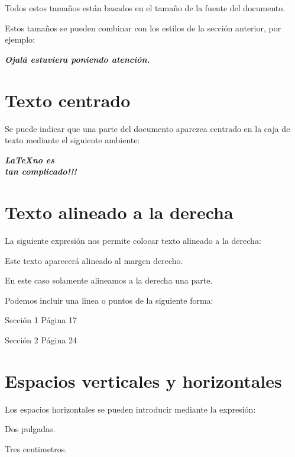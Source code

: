 \documentclass[letterpaper,11pt]{article}
\begin{document}
Todos estos tamaños están basados en el tamaño de la fuente del documento.

Estos tamaños se pueden combinar con los estilos de la sección anterior, por ejemplo:

\medskip

\begin{Large}
\textbf{\textit{Ojalá estuviera poniendo atención.}}
\end{Large}

\section{Texto centrado}

Se puede indicar que una parte del documento aparezca centrado en la caja de texto mediante el siguiente ambiente:

\begin{center}
\LARGE{\textbf{\textit{\LaTeX no es \\ tan complicado!!!}}}
\end{center}

\section{Texto alineado a la derecha}

La siguiente expresión nos permite colocar texto alineado a la derecha:

\hfill Este texto aparecerá alineado al margen derecho.

\bigskip

En este caso solamente alineamos a la derecha \hfill una parte.

Podemos incluir una linea o puntos de la siguiente forma:

\bigskip

Sección 1 \hrulefill Página 17

\bigskip

Sección 2 \dotfill Página 24

\section{Espacios verticales y horizontales}

Los espacios horizontales se pueden introducir mediante la expresión:

\hspace{2in}Dos pulgadas.

\hspace{3cm}Tres centimetros.
\end{document}

